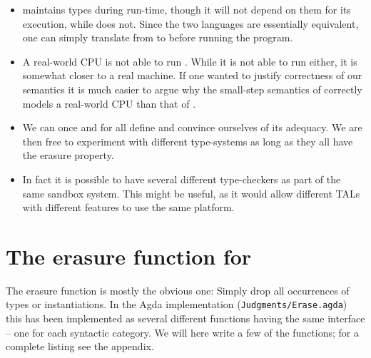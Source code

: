 \begin{itemize}
\item \ATAL maintains types during run-time, though it will not depend on them
  for its execution, while \ATALe does not. Since the two languages are
  essentially equivalent, one can simply translate from \ATAL to \ATALe before
  running the program.
\item A real-world CPU is not able to run \ATAL. While it is not able to run
  \ATALe either, it is somewhat closer to a real machine. If one wanted to
  justify correctness of our semantics it is much easier to argue why the
  small-step semantics of \ATALe correctly models a real-world CPU than that of
  \ATAL.
\item We can once and for all define \ATALe and convince ourselves of its
  adequacy. We are then free to experiment with different type-systems as long
  as they all have the erasure property.
\item In fact it is possible to have several different type-checkers as part of
  the same sandbox system. This might be useful, as it would allow different
  TALs with different features to use the same platform.
\end{itemize}

\section{The erasure function for \ATAL}

The erasure function is mostly the obvious one: Simply drop all occurrences of
types or instantiations. In the Agda implementation
(\texttt{Judgments/Erase.agda}) this has been implemented as several different
functions having the same interface -- one for each syntactic category. We will
here write a few of the functions; for a complete listing see the
appendix.

